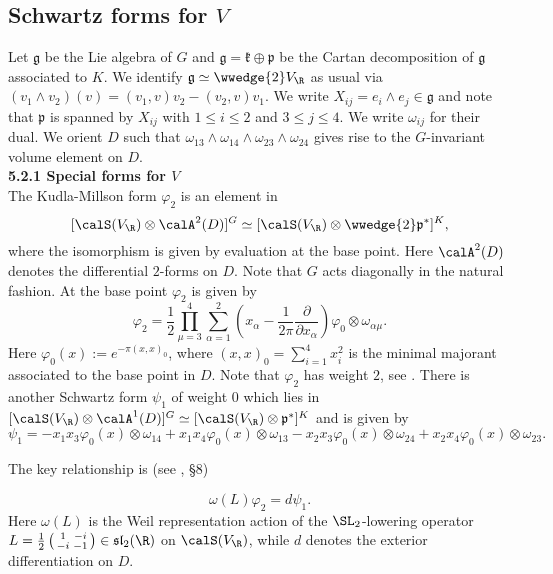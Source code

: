 \subsection{Schwartz forms for $V$}\label{V-forms}

Let $\mathfrak{g} $ be the Lie algebra of $G$ and $\mathfrak{g}= \mathfrak{k} \oplus \mathfrak{p}$ be the Cartan decomposition of $\mathfrak{g}$ associated to $K$.  We identify 
 $\mathfrak{g} \simeq \wwedge{2} V_{\R}$ as usual via $
(v_1 \wedge v_2)(v) = (v_1,v)v_2 - (v_2,v)v_1$. We write $X_{ij} = e_i \wedge e_j \in \mathfrak{g}$ and note that $\mathfrak{p}$ is spanned by $X_{ij}$ with $1 \leq i \leq 2$ and $3 \leq j \leq 4$. We write $\omega_{ij}$ for their dual. We orient $D$ such that $\omega_{13} \wedge \omega_{14} \wedge \omega_{23} \wedge \omega_{24}$ gives rise to the $G$-invariant volume element on $D$. 
\\[12pt] 
\textbf{5.2.1 Special forms for $V$} 
\\[10pt]
The Kudla-Millson form $\varphi_2$ is an element in 
\[
 [\calS(V_{\R}) \otimes \calA^2(D)]^G\simeq
[\calS(V_{\R}) \otimes \wwedge{2} \mathfrak{p}^{\ast}]^K,
\]
where the isomorphism is given by evaluation at the base point.
Here $\calA^2(D)$ denotes the differential $2$-forms on $D$. Note
that $G$ acts diagonally in the natural fashion. At the base point
$\varphi_2$ is given by
\[
\varphi_2= \frac12 \prod_{\mu=3}^4 \sum_{\alpha=1}^{2}  \left( x_{\alpha} - \frac1{2\pi}\frac{\partial}{\partial x_{\alpha}} \right) \varphi_0 \otimes \omega_{\alpha\mu}.
\]
Here $\varphi_0(x) := e^{-\pi(x,x)_{0}}$, where $(x,x)_0= \sum_{i=1}^4
x_i^2$ is the minimal majorant associated to the base point in $D$.
Note that $\varphi_2$ has weight $2$, see \cite{KM1}. There is
another Schwartz form $\psi_1$ of weight $0$ which lies in $
[\calS(V_{\R}) \otimes \calA^1(D)]^G\simeq
[\calS(V_{\R}) \otimes \mathfrak{p}^{\ast}]^K$ and is given by
\begin{equation}\label{psi20}
\psi_1 =  -x_1x_3\varphi_0(x) \otimes \omega_{14}+x_1x_4  \varphi_0(x) \otimes \omega_{13} - x_2x_3 \varphi_0(x) \otimes \omega_{24}+x_2x_4\varphi_0(x) \otimes \omega_{23}. 
\end{equation}


The key relationship is (see \cite{KM90}, \S 8)

\begin{theorem}\label{localholomorphic1}
\[
\omega(L) \varphi_2 = d \psi_1.
\]
Here $\omega(L)$ is the Weil representation action
of the $\SL_2$-lowering operator $L = \tfrac12 \left(
\begin{smallmatrix}1 & -i \\ -i & -1\end{smallmatrix} \right)  \in \mathfrak{sl}_2(\R)$ on
$\calS(V_{\R})$, while $d$ denotes the exterior differentiation on $D$. 
\end{theorem}

